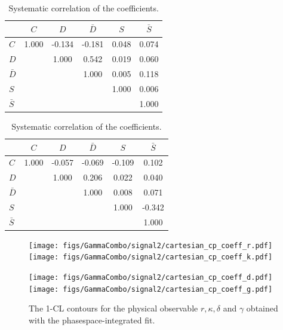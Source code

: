 \begin{table}[h]
\centering
\caption{Statistical correlation of the \CP coefficients.}
	\renewcommand{\arraystretch}{1}
\begin{tabular}{l | c c c c c } 
\hline
\hline
 & $C$ & $D$ & $\bar D$ & $S$ & $\bar S$  \\ 
\hline
$C$ &  1.000 & -0.134 & -0.181 & 0.048 & 0.074 \\
$D$ &  & 1.000 & 0.542 & 0.019 &  0.060 \\
$\bar{D}$ &  & &  1.000 &  0.005 & 0.118  \\
$S$ &  &&& 1.000 & 0.006 \\
$\bar{S}$ & &&&& 1.000 \\
\hline
\hline
\end{tabular}
\label{tab:statCorr}
%
\caption{Systematic correlation of the \CP coefficients.}
	\renewcommand{\arraystretch}{1}
\begin{tabular}{l | c c c c c } 
\hline
\hline
 & $C$ & $D$ & $\bar D$ & $S$ & $\bar S$  \\ 
\hline
$C$ &  1.000  &  -0.057  &  -0.069  &   -0.109   &    0.102 \\
$D$ &  & 1.000 &  0.206    & 0.022  &   0.040 \\
$\bar{D}$ &  & &  1.000 &  0.008  &   0.071  \\
$S$ &  &&& 1.000 &  -0.342 \\
$\bar{S}$ & &&&& 1.000 \\
\hline
\hline
\end{tabular}
\label{tab:systCorr}
\end{table}

\begin{figure}[h]
	\centering
		\texttt{[image: figs/GammaCombo/signal2/cartesian\_cp\_coeff\_r.pdf]} 
		\texttt{[image: figs/GammaCombo/signal2/cartesian\_cp\_coeff\_k.pdf]} 
		
		\texttt{[image: figs/GammaCombo/signal2/cartesian\_cp\_coeff\_d.pdf]} 
		\texttt{[image: figs/GammaCombo/signal2/cartesian\_cp\_coeff\_g.pdf]} 
		\caption{The 1-CL contours for the physical observable $r,\kappa,\delta$ and $\gamma$ obtained with the phasespace-integrated fit. }
		\label{fig:FitCL}	
\end{figure} 

